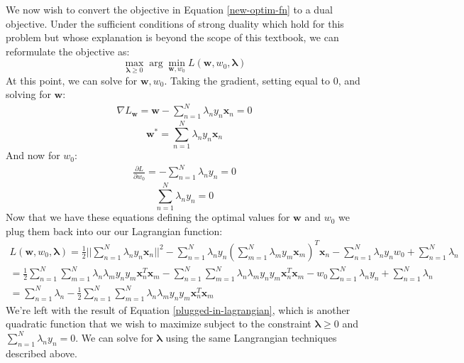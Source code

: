 We now wish to convert the objective in Equation \ref{new-optim-fn} to a dual objective. Under the sufficient conditions of strong duality which hold for this problem but whose explanation is beyond the scope of this textbook, we can reformulate the objective as:
\begin{equation} \label{dual-objective}
	\max_{\boldsymbol{\lambda} \geq 0} \arg\min_{\textbf{w}, w_{0}} L(\textbf{w}, w_{0}, \boldsymbol{\lambda})
\end{equation}
At this point, we can solve for $\textbf{w}, w_{0}$. Taking the gradient, setting equal to 0, and solving for $\textbf{w}$:
\begin{align*}
	\nabla L_{\textbf{w}} = \textbf{w} - \sum_{n=1}^{N} \lambda_{n} y_{n} \textbf{x}_{n} = 0
\end{align*}
\begin{equation} \label{solve-for-w}
	\textbf{w}^{*} = \sum_{n=1}^{N} \lambda_{n} y_{n} \textbf{x}_{n}
\end{equation}
And now for $w_{0}$:
\begin{align*}
	\frac{\partial L}{\partial w_{0}} = - \sum_{n=1}^{N} \lambda_{n} y_{n} = 0
\end{align*}
\begin{equation} \label{solve-for-w0}
	\sum_{n=1}^{N} \lambda_{n} y_{n} = 0
\end{equation}
Now that we have these equations defining the optimal values for $\textbf{w}$ and $w_{0}$ we plug them back into our our Lagrangian function:
\begin{equation} \label{plugged-in-lagrangian}
	\begin{aligned}
		L(\textbf{w}, w_{0}, \boldsymbol{\lambda}) = \frac{1}{2} || \sum_{n=1}^{N} \lambda_{n} y_{n} \textbf{x}_{n} ||^{2} - \sum_{n=1}^{N} \lambda_{n} y_{n} (\sum_{m=1}^{N} \lambda_{m} y_{m} \textbf{x}_{m})^{T} \textbf{x}_{n} - \sum_{n=1}^{N} \lambda_{n} y_{n} w_{0} + \sum_{n=1}^{N} \lambda_{n} \\
		= \frac{1}{2} \sum_{n=1}^{N} \sum_{m=1}^{N} \lambda_{n} \lambda_{m} y_{n} y_{m} \textbf{x}_{n}^{T} \textbf{x}_{m} - \sum_{n=1}^{N} \sum_{m=1}^{N} \lambda_{n} \lambda_{m} y_{n} y_{m} \textbf{x}_{n}^{T} \textbf{x}_{m} - w_{0} \sum_{n=1}^{N} \lambda_{n} y_{n} + \sum_{n=1}^{N} \lambda_{n} \\
		= \sum_{n=1}^{N} \lambda_{n} - \frac{1}{2} \sum_{n=1}^{N} \sum_{m=1}^{N} \lambda_{n} \lambda_{m} y_{n} y_{m} \textbf{x}_{n}^{T} \textbf{x}_{m}
	\end{aligned}
\end{equation}
We're left with the result of Equation \ref{plugged-in-lagrangian}, which is another quadratic function that we wish to maximize subject to the constraint $\boldsymbol{\lambda} \geq 0$ and $\sum_{n=1}^{N} \lambda_{n} y_{n} = 0$. We can solve for $\boldsymbol{\lambda}$ using the same Langrangian techniques described above.

